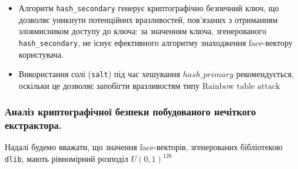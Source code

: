\documentclass[11pt]{article}
\providecommand{\tightlist}{%
      \setlength{\itemsep}{0pt}\setlength{\parskip}{0pt}}
\begin{document}
\begin{itemize}
\begin{itemize}
    \begin{itemize}
    \tightlist
    \item
      Алгоритм \texttt{hash\_secondary} генерує криптографічно безпечний
      ключ, що дозволяє уникнути потенційних вразливостей, пов'язаних з
      отриманням зловмисником доступу до ключа: за значенням ключа,
      згенерованого \texttt{hash\_secondary}, не існує ефективного
      алгоритму знаходження face-вектору користувача.
    \item
      Використання солі (\texttt{salt}) під час хешування
      \(hash\_primary\) рекомендується, оскільки це дозволяє
      запобігти вразливостям типу \(\text{Rainbow table attack}\)
    \end{itemize}
  \end{itemize}
\end{itemize}

    \hypertarget{ux430ux43dux430ux43bux456ux437-ux43aux440ux438ux43fux442ux43eux433ux440ux430ux444ux456ux447ux43dux43eux457-ux431ux435ux437ux43fux435ux43aux438-ux43fux43eux431ux443ux434ux43eux432ux430ux43dux43eux433ux43e-ux43dux435ux447ux456ux442ux43aux43eux433ux43e-ux435ux43aux441ux442ux440ux430ux43aux442ux43eux440ux430.}{%
\subsubsection{Аналіз криптографічної безпеки побудованого нечіткого
екстрактора.}\label{ux430ux43dux430ux43bux456ux437-ux43aux440ux438ux43fux442ux43eux433ux440ux430ux444ux456ux447ux43dux43eux457-ux431ux435ux437ux43fux435ux43aux438-ux43fux43eux431ux443ux434ux43eux432ux430ux43dux43eux433ux43e-ux43dux435ux447ux456ux442ux43aux43eux433ux43e-ux435ux43aux441ux442ux440ux430ux43aux442ux43eux440ux430.}}

Надалі будемо вважати, що значення face-векторів, згенерованих
бібліотекою \texttt{dlib}, мають рівномірний розподіл \(U(0,1)^{128}\)
\end{document}
